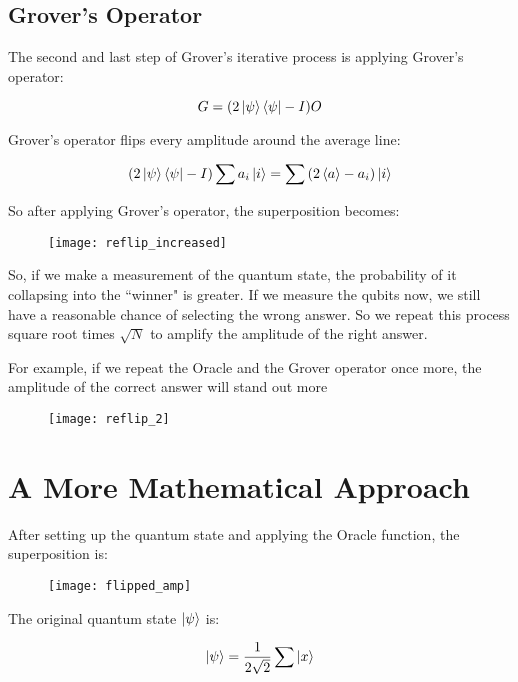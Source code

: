 \documentclass[a4paper]{article}
\begin{document}
\subsection{ Grover's Operator }
The second and last step of Grover's iterative process is applying Grover's operator:

$$ G = (2\ket{\psi}\bra{\psi} - I)O $$

Grover's operator flips every amplitude around the average line:

$$ (2\ket{\psi}\bra{\psi} - I)\sum{a_i \ket{i}} = \sum{(2\braket{a} - a_i)\ket{i}} $$

So after applying Grover's operator, the superposition becomes:

\begin{figure}[h]
\texttt{[image: reflip\_increased]}
\centering
\end{figure}

So, if we make a measurement of the quantum state, the probability of it
collapsing into the ``winner" is greater. If we measure the qubits now, we
still have a reasonable chance of selecting the wrong answer. So we repeat this
process square root times $\sqrt{N}$ to amplify the amplitude of the right answer.

\pagebreak

For example, if we repeat the Oracle and the Grover operator once more, the
amplitude of the correct answer will stand out more

\begin{figure}[h]
\texttt{[image: reflip\_2]}
\centering
\end{figure}

\section{ A More Mathematical Approach }

After setting up the quantum state and applying the Oracle function, the 
superposition is:

\begin{figure}[h]
\texttt{[image: flipped\_amp]}
\centering
\end{figure}

\par

The original quantum state $\ket{\psi}$ is:

$$ \ket{\psi} = \frac{1}{2\sqrt{2}}\sum{\ket{x}} $$
\end{document}
